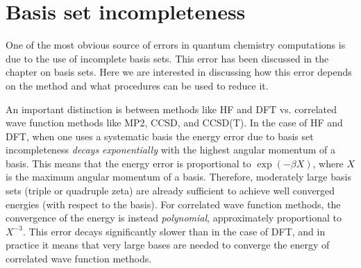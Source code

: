 \documentclass[../Main/notes.tex]{subfiles}
\begin{document}
\section{Basis set incompleteness}
One of the most obvious source of errors in quantum chemistry computations is due to the use of incomplete basis sets.
This error has been discussed in the chapter on basis sets.
Here we are interested in discussing how this error depends on the method and what procedures can be used to reduce it.

An important distinction is between methods like HF and DFT vs. correlated wave function methods like MP2, CCSD, and CCSD(T).
In the case of HF and DFT, when one uses a systematic basis the energy error due to basis set incompleteness \emph{decays exponentially} with the highest angular momentum of a basis.
This means that the energy error is proportional to $\exp(-\beta X)$, where $X$ is the maximum angular momentum of a basis.
Therefore, moderately large basis sets (triple or quadruple zeta) are already sufficient to achieve well converged energies (with respect to the basis).
For correlated wave function methods, the convergence of the energy is instead \emph{polynomial}, approximately proportional to $X^{-3}$.
This error decays significantly slower than in the case of DFT, and in practice it means that very large bases are needed to converge the energy of correlated wave function methods.

\end{document}
